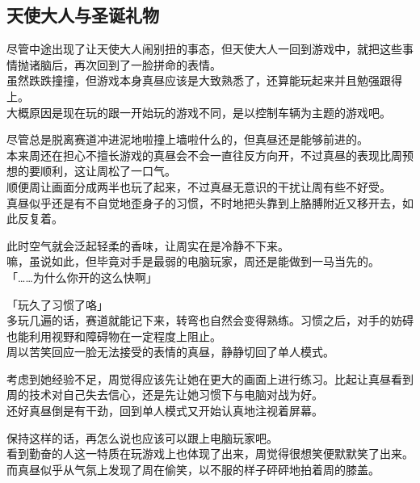 \subsection{天使大人与圣诞礼物}

尽管中途出现了让天使大人闹别扭的事态，但天使大人一回到游戏中，就把这些事情抛诸脑后，再次回到了一脸拼命的表情。\\

虽然跌跌撞撞，但游戏本身真昼应该是大致熟悉了，还算能玩起来并且勉强跟得上。\\

大概原因是现在玩的跟一开始玩的游戏不同，是以控制车辆为主题的游戏吧。

尽管总是脱离赛道冲进泥地啦撞上墙啦什么的，但真昼还是能够前进的。\\

本来周还在担心不擅长游戏的真昼会不会一直往反方向开，不过真昼的表现比周预想的要顺利，这让周松了一口气。\\

顺便周让画面分成两半也玩了起来，不过真昼无意识的干扰让周有些不好受。\\

真昼似乎还是有不自觉地歪身子的习惯，不时地把头靠到上胳膊附近又移开去，如此反复着。

此时空气就会泛起轻柔的香味，让周实在是冷静不下来。\\

嘛，虽说如此，但毕竟对手是最弱的电脑玩家，周还是能做到一马当先的。\\

「……为什么你开的这么快啊」

「玩久了习惯了咯」\\

多玩几遍的话，赛道就能记下来，转弯也自然会变得熟练。习惯之后，对手的妨碍也能利用视野和障碍物在一定程度上阻止。\\

周以苦笑回应一脸无法接受的表情的真昼，静静切回了单人模式。

考虑到她经验不足，周觉得应该先让她在更大的画面上进行练习。比起让真昼看到周的技术对自己失去信心，还是先让她习惯下与电脑对战为好。\\

还好真昼倒是有干劲，回到单人模式又开始认真地注视着屏幕。

保持这样的话，再怎么说也应该可以跟上电脑玩家吧。\\

看到勤奋的人这一特质在玩游戏上也体现了出来，周觉得很想笑便默默笑了出来。而真昼似乎从气氛上发现了周在偷笑，以不服的样子砰砰地拍着周的膝盖。


